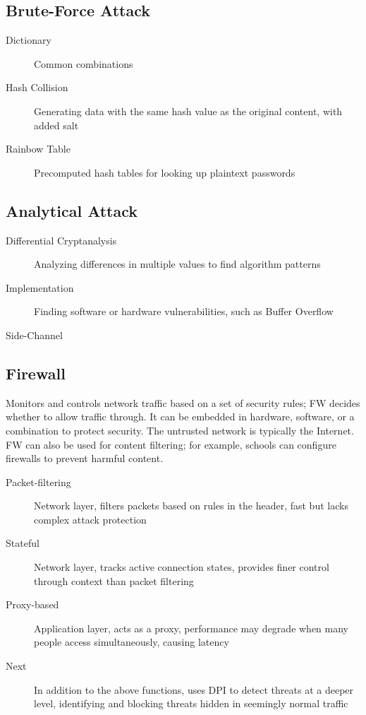 \documentclass[11pt,journal,compsoc]{IEEEtran}
\begin{document}
\subsection{Brute-Force Attack}

\begin{description}
    \item[Dictionary] Common combinations

    \item[Hash Collision] Generating data with the same hash value as the original content, with added salt

    \item[Rainbow Table] Precomputed hash tables for looking up plaintext passwords
\end{description}


\subsection{Analytical Attack}

\begin{description}
    \item[Differential Cryptanalysis] Analyzing differences in multiple values to find algorithm patterns

    \item[Implementation] Finding software or hardware vulnerabilities, such as Buffer Overflow

    \item[Side-Channel]
\end{description}


\subsection{Firewall}

Monitors and controls network traffic based on a set of security rules; FW decides whether to allow traffic through. It can be embedded in hardware, software, or a combination to protect security. The untrusted network is typically the Internet. FW can also be used for content filtering; for example, schools can configure firewalls to prevent harmful content.

\begin{description}
    \item[Packet-filtering] Network layer, filters packets based on rules in the header, fast but lacks complex attack protection

    \item[Stateful] Network layer, tracks active connection states, provides finer control through context than packet filtering

    \item[Proxy-based] Application layer, acts as a proxy, performance may degrade when many people access simultaneously, causing latency

    \item[Next] In addition to the above functions, uses DPI to detect threats at a deeper level, identifying and blocking threats hidden in seemingly normal traffic
\end{description}
\end{document}
